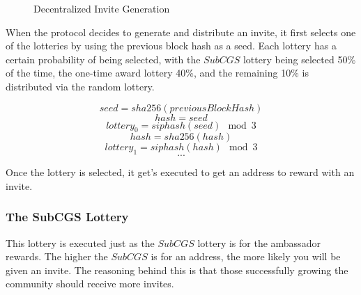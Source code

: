 \documentclass{article}
\begin{document}
\begin{figure}[H]
    \begin{center}
    \end{center}
    \caption{Decentralized Invite Generation}
\end{figure}

When the protocol decides to generate and distribute an invite, it first selects
one of the lotteries by using the previous block hash as a seed.  Each lottery
has a certain probability of being selected, with the $SubCGS$ lottery being
selected 50\% of the time, the one-time award lottery 40\%, and the remaining
10\% is distributed via the random lottery.

    $$seed = sha256(previousBlockHash)$$
    $$hash = seed$$
    $$lottery_0 = siphash(seed) \mod 3$$
    $$hash = sha256(hash)$$
    $$lottery_1 = siphash(hash) \mod 3$$
    $$...$$

Once the lottery is selected, it get's executed to get an address to reward with an invite.

\subsubsection{The SubCGS Lottery}

This lottery is executed just as the $SubCGS$ lottery is for the ambassador rewards.
The higher the $SubCGS$ is for an address, the more likely you will be given an invite.  The
reasoning behind this is that those successfully growing the community should receive 
more invites.
\end{document}
